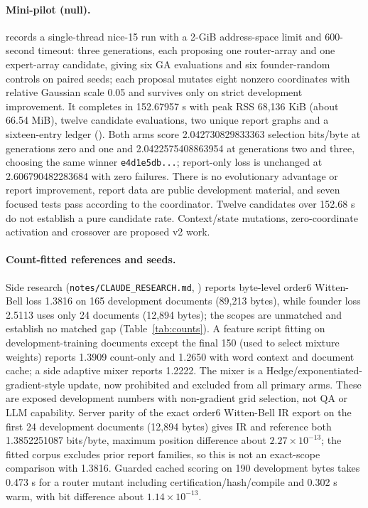 \documentclass[11pt]{article}
\begin{document}
\paragraph{Mini-pilot (null).}  records a
single-thread nice-15 run with a 2-GiB address-space limit and 600-second timeout: three generations,
each proposing one router-array and one expert-array candidate, giving six GA evaluations and six
founder-random controls on paired seeds; each proposal mutates eight nonzero coordinates with
relative Gaussian scale 0.05 and survives only on strict development improvement. It completes in
152.67957 s with peak RSS 68{,}136 KiB (about 66.54 MiB), twelve candidate evaluations, two
unique report graphs and a sixteen-entry ledger
(). Both arms score 2.042730829833363
selection bits/byte at generations zero and one and 2.0422575408863954 at generations two and
three, choosing the same winner \texttt{e4d1e5db...}; report-only loss is unchanged at
2.606790482283684 with zero failures. There is no evolutionary advantage or report
improvement, report data are public development material, and seven focused tests pass according
to the coordinator. Twelve candidates over 152.68 s do not establish a pure candidate rate.
Context/state mutations, zero-coordinate activation and crossover are proposed v2 work.

\paragraph{Count-fitted references and seeds.} Side research (\texttt{notes/CLAUDE\_RESEARCH.md},
) reports byte-level order6 Witten-Bell loss 1.3816 on
165 development documents (89{,}213 bytes), while founder loss 2.5113 uses only 24 documents
(12{,}894 bytes); the scopes are unmatched and establish no matched gap (Table~\ref{tab:counts}).
A feature script fitting on development-training documents except the final 150 (used to select
mixture weights) reports 1.3909 count-only and 1.2650 with word context and document cache; a
side adaptive mixer reports 1.2222. The mixer is a Hedge/exponentiated-gradient-style update, now
prohibited and excluded from all primary arms. These are exposed development numbers with
non-gradient grid selection, not QA or LLM capability. Server parity of the exact order6 Witten-Bell
IR export on the first 24 development documents (12{,}894 bytes) gives IR and reference both
1.3852251087 bits/byte, maximum position difference about $2.27\times10^{-13}$; the fitted corpus
excludes prior report families, so this is not an exact-scope comparison with 1.3816. Guarded cached
scoring on 190 development bytes takes 0.473 s for a router mutant including
certification/hash/compile and 0.302 s warm, with bit difference about $1.14\times10^{-13}$.
\end{document}

